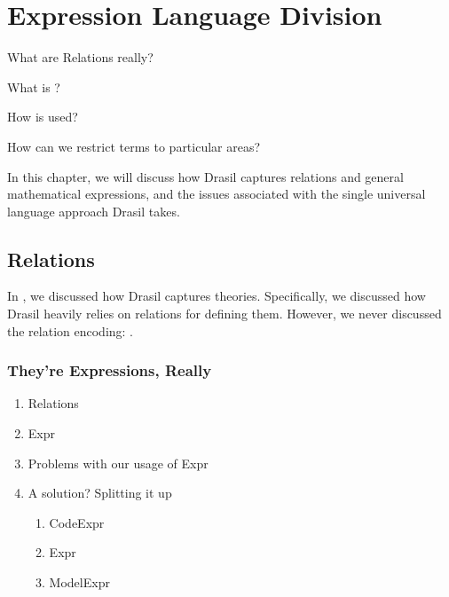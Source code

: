 \chapter{Expression Language Division}
\label{chap:lang-division}

\begin{writingdirectives}
    \item What are Relations really?
    \item What is \Expr{}?
    \item How is \Expr{} used?
    \item How can we restrict \Expr{} terms to particular areas?
\end{writingdirectives}

In this chapter, we will discuss how Drasil captures relations and general
mathematical expressions, and the issues associated with the single universal
language approach Drasil takes.

\section{Relations}
\label{chap:lang-division:sec:relations}

In , we discussed how Drasil captures theories.
Specifically, we discussed how Drasil heavily relies on relations for defining
them. However, we never discussed the relation encoding: \Relation{}.

\originalRelation{}



\subsection{They're Expressions, Really}
\label{chap:lang-division:sec:relations:subsec:expressions}



\begin{enumerate}
    \item Relations
    \item Expr
    \item Problems with our usage of Expr
    \item A solution? Splitting it up
    \begin{enumerate}
        \item CodeExpr
        \item Expr
        \item ModelExpr
    \end{enumerate}
\end{enumerate}









